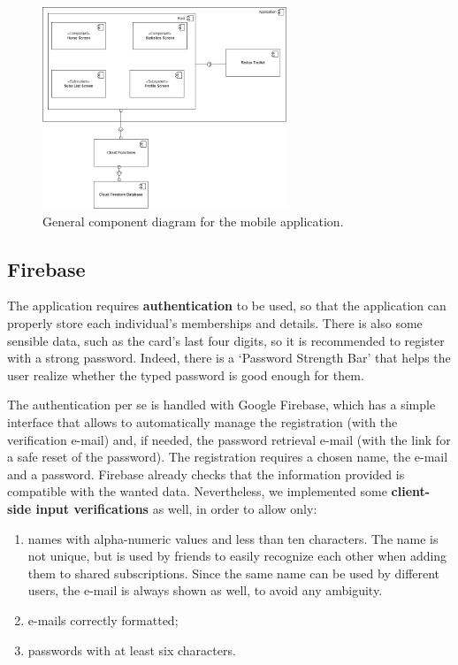 \documentclass[12pt]{article}
\begin{document}
\begin{figure}[h!]
    \begin{center}
        \includegraphics[width=0.65\textwidth, clip]{../../assets/generalComponent.drawio.png}
    \end{center}
    \caption{General component diagram for the mobile application.}
    \label{fig:componentGen}
\end{figure}
\vspace{0.5cm}

\subsection{Firebase}
The application requires \textbf{authentication} to be used, so that the application can properly store each individual's memberships and details. There is also some sensible data, such as the card's last four digits, so it is recommended to register with a strong password. Indeed, there is a `Password Strength Bar' that helps the user realize whether the typed password is good enough for them.

The authentication per se is handled with Google Firebase, which has a simple interface that allows to automatically manage the registration (with the verification e-mail) and, if needed, the password retrieval e-mail (with the link for a safe reset of the password). The registration requires a chosen name, the e-mail and a password. Firebase already checks that the information provided is compatible with the wanted data. Nevertheless, we implemented some \textbf{client-side input verifications} as well, in order to allow only:
\begin{enumerate}
    \item names with alpha-numeric values and less than ten characters. The name is not unique, but is used by friends to easily recognize each other when adding them to shared subscriptions. Since the same name can be used by different users, the e-mail is always shown as well, to avoid any ambiguity.
    \item e-mails correctly formatted;
    \item passwords with at least six characters.
\end{enumerate}
\end{document}
